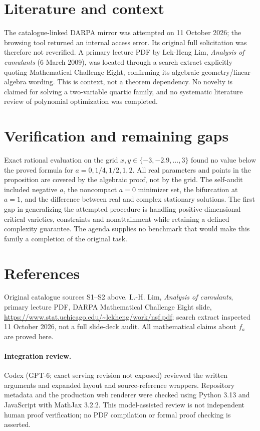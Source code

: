 \documentclass[11pt]{article}
\begin{document}
\section{Literature and context}
The catalogue-linked DARPA mirror was attempted on 11 October 2026; the browsing tool returned an internal access error. Its original full solicitation was therefore not reverified. A primary lecture PDF by Lek-Heng Lim, \emph{Analysis of cumulants} (6 March 2009), was located through a search extract explicitly quoting Mathematical Challenge Eight, confirming its algebraic-geometry/linear-algebra wording. This is context, not a theorem dependency. No novelty is claimed for solving a two-variable quartic family, and no systematic literature review of polynomial optimization was completed.

\section{Verification and remaining gaps}
Exact rational evaluation on the grid $x,y\in\{-3,-2.9,\ldots,3\}$ found no value below the proved formula for $a=0,1/4,1/2,1,2$. All real parameters and points in the proposition are covered by the algebraic proof, not by the grid. The self-audit included negative $a$, the noncompact $a=0$ minimizer set, the bifurcation at $a=1$, and the difference between real and complex stationary solutions. The first gap in generalizing the attempted procedure is handling positive-dimensional critical varieties, constraints and nonattainment while retaining a defined complexity guarantee. The agenda supplies no benchmark that would make this family a completion of the original task.

\section{References}
Original catalogue sources S1--S2 above. L.-H. Lim, \emph{Analysis of cumulants}, primary lecture PDF, DARPA Mathematical Challenge Eight slide, \url{https://www.stat.uchicago.edu/~lekheng/work/nsf.pdf}; search extract inspected 11 October 2026, not a full slide-deck audit. All mathematical claims about $f_a$ are proved here.


\paragraph{Integration review.} Codex (GPT-6; exact serving revision not exposed) reviewed the written arguments and expanded layout and source-reference wrappers. Repository metadata and the production web renderer were checked using Python 3.13 and JavaScript with MathJax 3.2.2. This model-assisted review is not independent human proof verification; no PDF compilation or formal proof checking is asserted.
\end{document}
